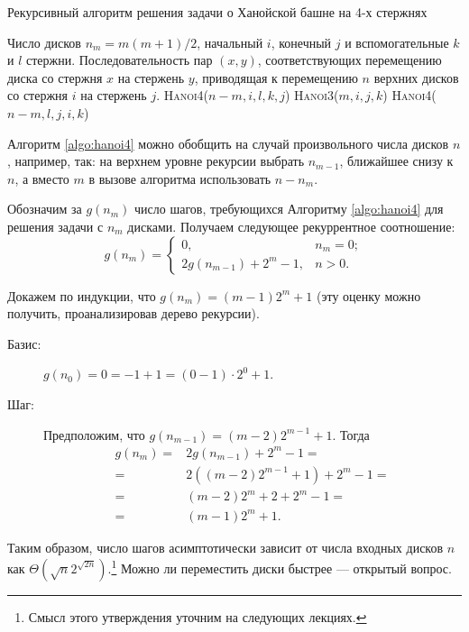 \documentclass[a4paper,12pt]{article}
\begin{document}
\begin{algorithm}[H]
	\caption{Рекурсивный алгоритм решения задачи о Ханойской башне на 4-х стержнях}
	\label{algo:hanoi4}
	\begin{algorithmic}[1]
		\Require Число дисков $n_m = m(m+1)/2$, начальный $i$, конечный $j$ и 
		вспомогательные $k$ и $l$ стержни.
		\Ensure Последовательность пар $(x, y)$, соответствующих перемещению диска 
		со стержня $x$ на стержень $y$, приводящая к перемещению $n$ верхних дисков
		 со стержня $i$ на стержень $j$.
				\State \textsc{Hanoi4}($n-m,i,l,k,j$)
				\State \textsc{Hanoi3}($m,i,j,k$)
				\State \textsc{Hanoi4}($n-m,l,j,i,k$)
			\EndIf
		\EndFunction
	\end{algorithmic}
\end{algorithm}

Алгоритм \ref{algo:hanoi4} можно обобщить на случай произвольного числа дисков 
$n$, например, так: на верхнем уровне рекурсии выбрать $n_{m-1}$, ближайшее 
снизу к $n$, а вместо $m$ в вызове алгоритма  использовать 
$n - n_m$.

Обозначим за $g(n_m)$ число шагов, требующихся Алгоритму \ref{algo:hanoi4} для 
решения задачи с $n_m$ дисками. Получаем следующее рекуррентное соотношение:
\[g(n_m) = \begin{cases}
	0, & n_m = 0; \\
	2g(n_{m-1}) + 2^m - 1, & n > 0.
	\end{cases}\]

Докажем по индукции, что $g(n_m) = (m - 1)2^m + 1$ (эту оценку можно получить, проанализировав дерево рекурсии).
\begin{description}
	\item[Базис:] $g(n_0) = 0 = -1 + 1 = (0 - 1) \cdot 2^0 + 1$.
	\item[Шаг:] Предположим, что $g(n_{m-1}) = (m - 2)2^{m-1} + 1$. Тогда
	\begin{align*} %
	   g(n_m) = {}& 2g(n_{m-1}) + 2^m - 1 = \\
	   = {}& 2((m - 2)2^{m-1} + 1) + 2^m - 1 = \\
	   = {}& (m - 2)2^m + 2 + 2^m - 1 = \\
	   = {}& (m - 1)2^m + 1.
	\end{align*}
\end{description}

Таким образом, число шагов асимптотически зависит от числа входных дисков $n$ как $\Theta(\sqrt{n}2^{\sqrt{2n}})$.\footnote{Смысл этого утверждения уточним на следующих лекциях.} Можно ли переместить диски быстрее --- открытый вопрос.
\end{document}
